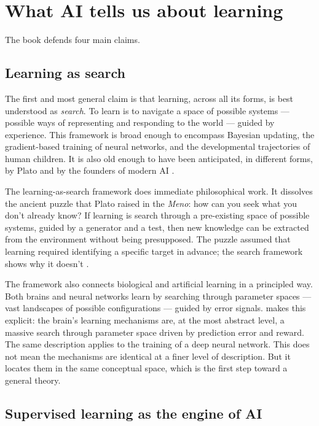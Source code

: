 \documentclass{drpaper}
\begin{document}
\section{What AI tells us about learning}

The book defends four main claims.

\subsection{Learning as search}

The first and most general claim is that learning, across all its forms, is best understood as \emph{search}. To learn is to navigate a space of possible systems — possible ways of representing and responding to the world — guided by experience. This framework is broad enough to encompass Bayesian updating, the gradient-based training of neural networks, and the developmental trajectories of human children. It is also old enough to have been anticipated, in different forms, by Plato and by the founders of modern AI \citep{NewellSimon1976}.

The learning-as-search framework does immediate philosophical work. It dissolves the ancient puzzle that Plato raised in the \emph{Meno}: how can you seek what you don't already know? If learning is search through a pre-existing space of possible systems, guided by a generator and a test, then new knowledge can be extracted from the environment without being presupposed. The puzzle assumed that learning required identifying a specific target in advance; the search framework shows why it doesn't \citep{PlatoMeno}.

The framework also connects biological and artificial learning in a principled way. Both brains and neural networks learn by searching through parameter spaces — vast landscapes of possible configurations — guided by error signals. \citet{dehaene2020we} makes this explicit: the brain's learning mechanisms are, at the most abstract level, a massive search through parameter space driven by prediction error and reward. The same description applies to the training of a deep neural network. This does not mean the mechanisms are identical at a finer level of description. But it locates them in the same conceptual space, which is the first step toward a general theory.

\subsection{Supervised learning as the engine of AI}
\end{document}
